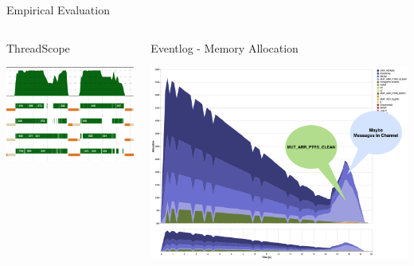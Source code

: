 \documentclass{beamer}
\begin{document}
  \begin{frame}[fragile]{Empirical Evaluation}
    \begin{columns}[onlytextwidth] 
      \begin{column}{.45\textwidth} 
        \begin{block}{ThreadScope}
          \begin{minipage}{\textwidth}
            \includegraphics[width=1\linewidth, height=0.5\textheight]{screen_2}
          \end{minipage}%
        \end{block}%
      \end{column} \hfill%
      \begin{column}{.45\textwidth} 
        \begin{block}{Eventlog - Memory Allocation}
          \begin{minipage}{\textwidth}
            \includegraphics[width=1\linewidth, height=0.5\textheight]{visualization}
          \end{minipage}%
        \end{block}
    \end{column} 
  \end{columns}
  \end{frame}
\end{document}
